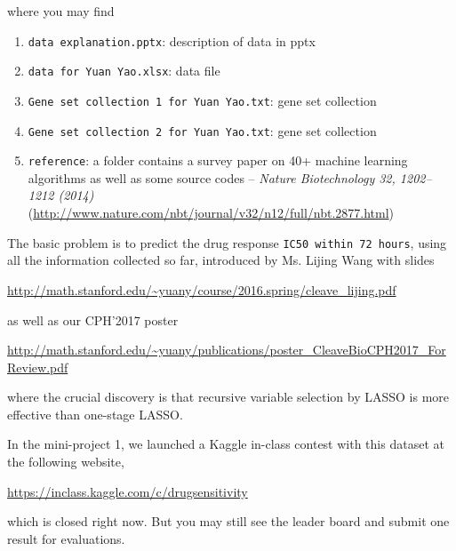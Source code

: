 \documentclass[11pt]{article}
\begin{document}
\noindent where you may find
\begin{enumerate}
\item \texttt{data explanation.pptx}: description of data in pptx
\item \texttt{data for Yuan Yao.xlsx}: data file
\item \texttt{Gene set collection 1 for Yuan Yao.txt}: gene set collection
\item \texttt{Gene set collection 2 for Yuan Yao.txt}: gene set collection
\item \texttt{reference}: a folder contains a survey paper on 40+ machine learning algorithms as well as some source codes -- \emph{Nature Biotechnology 32, 1202--1212 (2014)} (\url{http://www.nature.com/nbt/journal/v32/n12/full/nbt.2877.html})
\end{enumerate}

The basic problem is to predict the drug response \texttt{IC50 within 72 hours}, using all the information collected so far, introduced by Ms. Lijing Wang with slides

\url{http://math.stanford.edu/~yuany/course/2016.spring/cleave_lijing.pdf}

\noindent as well as our CPH'2017 poster

\url{http://math.stanford.edu/~yuany/publications/poster_CleaveBioCPH2017_ForReview.pdf}

\noindent where the crucial discovery is that recursive variable selection by LASSO is more effective than one-stage LASSO. 

In the mini-project 1, we launched a Kaggle in-class contest with this dataset at the following website,

\url{https://inclass.kaggle.com/c/drugsensitivity}

\noindent which is closed right now. But you may still see the leader board and submit one result for evaluations. 

%
% 
%
%
%
%
%
%
\end{document}

